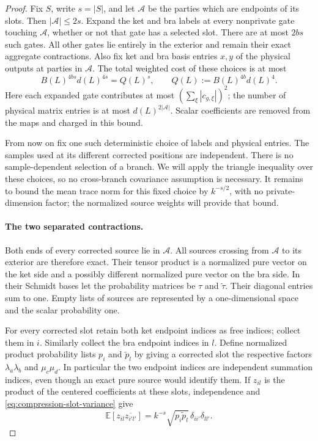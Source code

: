 \begin{proof}
Fix $S$, write $s=|S|$, and let $\mathcal A$ be the parties which are
endpoints of its slots.  Then $|\mathcal A|\le2s$.  Expand the ket and
bra labels at every nonprivate gate touching $\mathcal A$, whether or
not that gate has a selected slot.  There are at most $2bs$ such gates.
All other gates lie entirely in the exterior and remain their exact
aggregate contractions.  Also fix ket and bra basis entries $x,y$ of
the physical outputs at parties in $\mathcal A$.  The total weighted
cost of these choices is at most
\begin{equation}
 B(L)^{4bs}d(L)^{4s}=Q(L)^s,
 \qquad Q(L):=B(L)^{4b}d(L)^4.
 \label{eq:compression-choice-cost}
\end{equation}
Here each expanded gate contributes at most
$(\sum_\xi|c_{g,\xi}|)^2$; the number of physical matrix entries is at
most $d(L)^{2|\mathcal A|}$.  Scalar coefficients are removed from the
maps and charged in this bound.

From now on fix one such deterministic choice of labels and physical
entries.  The samples used at its different corrected positions are
independent.  There is no sample-dependent selection of a branch.  We
will apply the triangle inequality over these choices, so no
cross-branch covariance assumption is necessary.  It remains to bound the
mean trace norm for this fixed choice by $k^{-s/2}$, with no private-dimension
factor; the normalized source weights will provide that bound.

\paragraph{The two separated contractions.}
Both ends of every corrected source lie in $\mathcal A$.  All sources
crossing from $\mathcal A$ to its exterior are therefore exact.  Their
tensor product is a normalized pure vector on the ket side and a
possibly different normalized pure vector on the bra side.  In their
Schmidt bases let the probability matrices be $\tau$ and
$\widetilde\tau$.  Their diagonal entries sum to one.  Empty lists of
sources are represented by a one-dimensional space and the scalar
probability one.

For every corrected slot retain both ket endpoint indices as free
indices; collect them in $i$.  Similarly collect the bra endpoint
indices in $l$.  Define normalized product probability lists $p_i$ and
$\widetilde p_l$ by giving a corrected slot the respective factors
$\lambda_a\lambda_b$ and $\mu_c\mu_d$.  In particular the two endpoint
indices are independent summation indices, even though an exact pure
source would identify them.  If $z_{il}$ is the product of the centered
coefficients at these slots, independence and
\eqref{eq:compression-slot-variance} give
\begin{equation}
 \mathbb E[z_{il}\overline{z_{i'l'}}]
       =k^{-s}\sqrt{p_i\widetilde p_l}\,
                      \delta_{ii'}\delta_{ll'}.
 \label{eq:compression-product-covariance}
\end{equation}


\end{proof}
